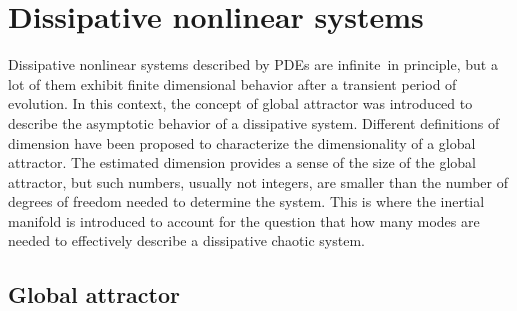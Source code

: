 

\section{Dissipative nonlinear systems}
\label{sect:diss}

Dissipative nonlinear systems described by PDEs
are infinite\dmn\ in principle, but a lot of them
exhibit finite dimensional behavior after a
transient period of evolution. In this context,
the concept of global attractor was
introduced to describe the asymptotic behavior of a dissipative
system. Different definitions of dimension
have been proposed to characterize the dimensionality of a
global attractor. The estimated dimension provides a sense
of the
size of the global attractor, but such numbers, usually not integers,
are smaller than the number
of degrees of
freedom needed to determine the system. This is where the inertial
manifold is introduced to account for the question that how many modes
are needed to effectively describe a dissipative chaotic system.

\subsection{Global attractor}


